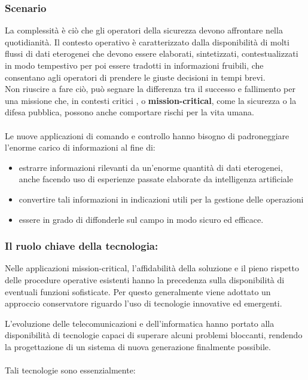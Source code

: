 \subsubsection{Scenario}
La complessità è ciò che gli operatori della sicurezza devono affrontare nella quotidianità.
Il contesto operativo è caratterizzato dalla disponibilità di
molti flussi di dati eterogenei che devono essere elaborati,
sintetizzati, contestualizzati in modo tempestivo per poi essere
tradotti in informazioni fruibili, che consentano agli operatori di
prendere le giuste decisioni in tempi brevi.\\
Non riuscire a fare ciò, può segnare la differenza tra il successo
e fallimento per una missione che, in contesti critici , o \textbf{mission-critical}, come
la sicurezza o la difesa pubblica, possono anche comportare rischi per la vita umana.
\\\\
Le nuove applicazioni di comando e controllo hanno bisogno di padroneggiare l'enorme carico di informazioni
al fine di:
\begin{itemize}
    \item estrarre informazioni rilevanti da un'enorme quantità di
    dati eterogenei, anche facendo uso di esperienze passate elaborate da intelligenza artificiale
    \item convertire tali informazioni in indicazioni utili per la gestione delle operazioni
    \item essere in grado di diffonderle sul campo in modo sicuro ed efficace.
\end{itemize}

\subsubsection{Il ruolo chiave della tecnologia:}
Nelle applicazioni mission-critical, l'affidabilità
della soluzione e il pieno rispetto delle 
procedure operative esistenti hanno la precedenza
sulla disponibilità di eventuali funzioni sofisticate. 
Per questo generalmente viene adottato un approccio conservatore
 riguardo l'uso di tecnologie innovative ed emergenti.

L'evoluzione delle telecomunicazioni e dell'informatica 
hanno portato alla disponibilità di tecnologie capaci
di superare alcuni problemi bloccanti, rendendo la
progettazione di un sistema di nuova generazione finalmente possibile.
\\\\
Tali tecnologie sono essenzialmente:

